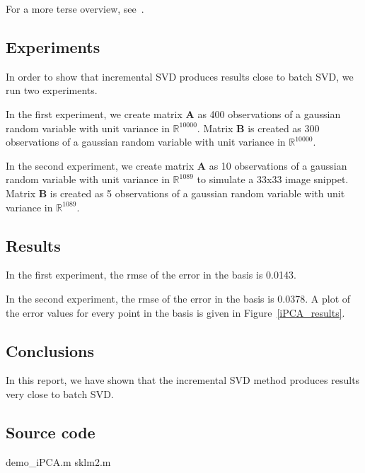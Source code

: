 For a more terse overview, see~\cite{2008_JNL_subspaceTRK_Ross}.

\subsection{Experiments}

In order to show that incremental SVD produces results close to batch SVD, we run two experiments.

In the first experiment, we create matrix $\mathbf{A}$ as 400 observations of a gaussian random variable with unit variance in $\mathbb{R}^{10000}$.  Matrix $\mathbf{B}$ is created as 300 observations of a gaussian random variable with unit variance in $\mathbb{R}^{10000}$.  

In the second experiment, we create matrix $\mathbf{A}$ as 10 observations of a gaussian random variable with unit variance in $\mathbb{R}^{1089}$ to simulate a 33x33 image snippet.  Matrix $\mathbf{B}$ is created as 5 observations of a gaussian random variable with unit variance in $\mathbb{R}^{1089}$. 



\subsection{Results}

In the first experiment, the rmse of the error in the basis is 0.0143.

In the second experiment, the rmse of the error in the basis is 0.0378.  A plot of the error values for every point in the basis is given in Figure~\ref{iPCA_results}.




\subsection{Conclusions}

In this report, we have shown that the incremental SVD method produces results very close to batch SVD.


\subsection{Source code}
\scriptsize
	{demo_iPCA.m}
		{sklm2.m}

\normalsize


